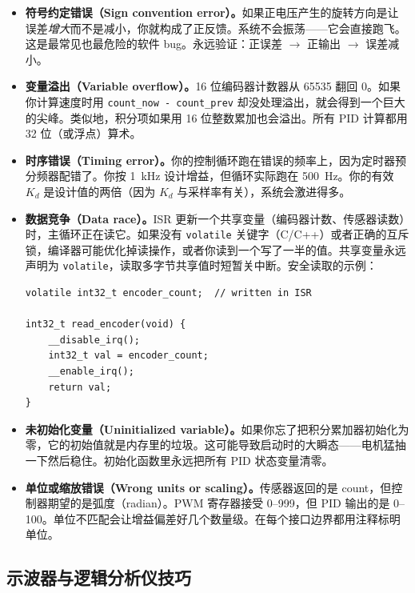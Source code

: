 \begin{itemize}
    \item \textbf{符号约定错误（Sign convention error）。}如果正电压产生的旋转方向是让误差\textit{增大}而不是减小，你就构成了正反馈。系统不会振荡——它会直接跑飞。这是最常见也最危险的软件 bug。永远验证：正误差 $\to$ 正输出 $\to$ 误差减小。

    \item \textbf{变量溢出（Variable overflow）。}16 位编码器计数器从 65535 翻回 0。如果你计算速度时用 \texttt{count\_now - count\_prev} 却没处理溢出，就会得到一个巨大的尖峰。类似地，积分项如果用 16 位整数累加也会溢出。所有 PID 计算都用 32 位（或浮点）算术。

    \item \textbf{时序错误（Timing error）。}你的控制循环跑在错误的频率上，因为定时器预分频器配错了。你按 1~kHz 设计增益，但循环实际跑在 500~Hz。你的有效 $K_d$ 是设计值的两倍（因为 $K_d$ 与采样率有关），系统会激进得多。

    \item \textbf{数据竞争（Data race）。}ISR 更新一个共享变量（编码器计数、传感器读数）时，主循环正在读它。如果没有 \texttt{volatile} 关键字（C/C++）或者正确的互斥锁，编译器可能优化掉读操作，或者你读到一个写了一半的值。共享变量永远声明为 \texttt{volatile}，读取多字节共享值时短暂关中断。安全读取的示例：

\begin{verbatim}
volatile int32_t encoder_count;  // written in ISR

int32_t read_encoder(void) {
    __disable_irq();
    int32_t val = encoder_count;
    __enable_irq();
    return val;
}
\end{verbatim}

    \item \textbf{未初始化变量（Uninitialized variable）。}如果你忘了把积分累加器初始化为零，它的初始值就是内存里的垃圾。这可能导致启动时的大瞬态——电机猛抽一下然后稳住。初始化函数里永远把所有 PID 状态变量清零。

    \item \textbf{单位或缩放错误（Wrong units or scaling）。}传感器返回的是 count，但控制器期望的是弧度（radian）。PWM 寄存器接受 0--999，但 PID 输出的是 0--100。单位不匹配会让增益偏差好几个数量级。在每个接口边界都用注释标明单位。
\end{itemize}

\subsection{示波器与逻辑分析仪技巧}

